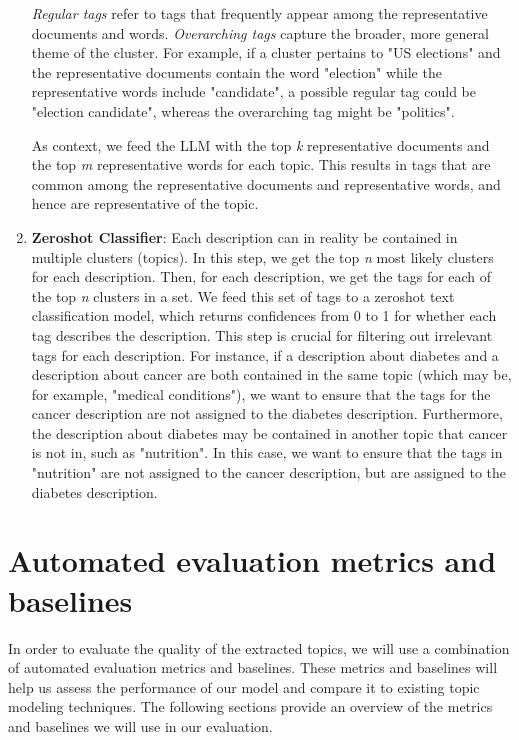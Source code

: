 \begin{enumerate}
    \textit{Regular tags} refer to tags that frequently appear among the representative documents and words. \textit{Overarching tags} capture the broader, more general theme of the cluster. For example, if a cluster pertains to "US elections" and the representative documents contain the word "election" while the representative words include "candidate", a possible regular tag could be "election candidate", whereas the overarching tag might be "politics".

    As context, we feed the LLM with the top \textit{k} representative documents and the top \textit{m} representative words for each topic. This results in tags that are common among the representative documents and representative words, and hence are representative of the topic.
    \item \textbf{Zeroshot Classifier}: Each description can in reality be contained in multiple clusters (topics). In this step, we get the top \textit{n} most likely clusters for each description. Then, for each description, we get the tags for each of the top \textit{n} clusters in a set. We feed this set of tags to a zeroshot text classification model, which returns confidences from 0 to 1 for whether each tag describes the description. This step is crucial for filtering out irrelevant tags for each description. For instance, if a description about diabetes and a description about cancer are both contained in the same topic (which may be, for example, "medical conditions"), we want to ensure that the tags for the cancer description are not assigned to the diabetes description. Furthermore, the description about diabetes may be contained in another topic that cancer is not in, such as "nutrition". In this case, we want to ensure that the tags in "nutrition" are not assigned to the cancer description, but are assigned to the diabetes description.

\end{enumerate}


\section{Automated evaluation metrics and baselines}
In order to evaluate the quality of the extracted topics, we will use a combination of automated evaluation metrics and baselines. These metrics and baselines will help us assess the performance of our model and compare it to existing topic modeling techniques. The following sections provide an overview of the metrics and baselines we will use in our evaluation.

